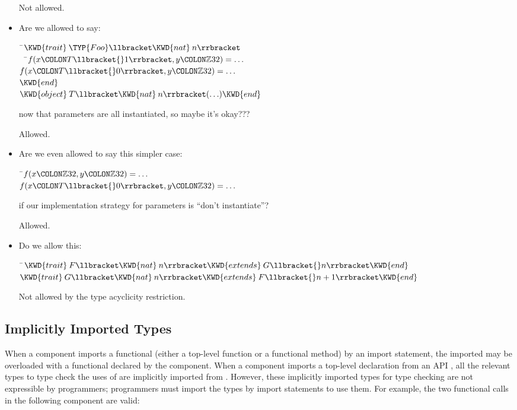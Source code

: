 \begin{itemize}
Not allowed.
\item Are we allowed to say:
\begin{Fortress}
{\tt~}\pushtabs\=\+\( \KWD{trait}\:\TYP{Foo}\llbracket\KWD{nat}\:n\rrbracket\)\\
{\tt~~}\pushtabs\=\+\(   f(x\COLON T\llbracket{}1\rrbracket, y\COLON \mathbb{Z}32) = \ldots\)\\
\(   f(x\COLON T\llbracket{}0\rrbracket, y\COLON \mathbb{Z}32) = \ldots\)\-\\\poptabs
\( \KWD{end}\)\\
\( \KWD{object}\:T\llbracket\KWD{nat}\:n\rrbracket( \ldots ) \KWD{end}\)\-\\\poptabs
\end{Fortress}
now that  parameters are all instantiated, so maybe it's okay???

Allowed.
\item Are we even allowed to say this simpler case:
\begin{Fortress}
{\tt~}\pushtabs\=\+\( f(x\COLON \mathbb{Z}32, y\COLON \mathbb{Z}32) = \ldots\)\\
\( f(x\COLON T\llbracket{}0\rrbracket, y\COLON \mathbb{Z}32) = \ldots\)\-\\\poptabs
\end{Fortress}
if our implementation strategy for  parameters is ``don't instantiate''?

Allowed.

\item Do we allow this:
\begin{Fortress}
{\tt~}\pushtabs\=\+\( \KWD{trait}\:F\llbracket\KWD{nat}\:n\rrbracket \KWD{extends}\:G\llbracket{}n\rrbracket \KWD{end}\)\\
\( \KWD{trait}\:G\llbracket\KWD{nat}\:n\rrbracket \KWD{extends}\:F\llbracket{}n+1\rrbracket \KWD{end}\)\-\\\poptabs
\end{Fortress}
Not allowed by the type acyclicity restriction.

\end{itemize}

\subsection{Implicitly Imported Types}
When a component imports a functional 
(either a top-level function or a functional method) by an import statement,
the imported  may be overloaded with a functional  declared by the component.
When a component imports a top-level declaration  from an API ,
all the relevant types to type check the uses of  are implicitly imported from .
However, these implicitly imported types for type checking are not expressible by programmers;
programmers must import the types by import statements to use them.
For example, the two functional calls in the following component  are valid:

